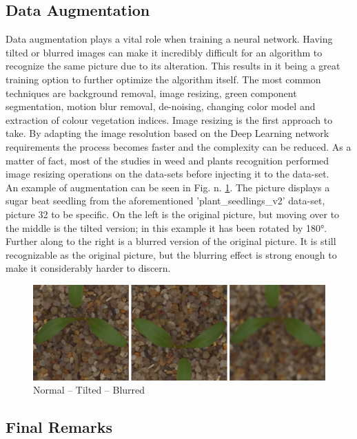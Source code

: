 \documentclass[english]{lni}
\begin{document}
\subsection{Data Augmentation}
Data augmentation plays a vital role when training a neural network. Having tilted or blurred images can make it incredibly difficult for an algorithm to recognize the same picture due to its alteration. This results in it being a great training option to further optimize the algorithm itself. The most common techniques are background removal, image resizing, green component segmentation, motion blur removal, de-noising, changing color model and extraction of colour vegetation indices.
Image resizing is the first approach to take. By adapting the image resolution based on the Deep Learning network requirements the process becomes faster and the complexity can be reduced. As a matter of fact, most of the studies in weed and plants recognition performed image resizing operations on the data-sets before injecting it to the data-set. \cite{DBLP:journals/corr/abs-2103-01415}\\
An example of augmentation can be seen in Fig. n. \ref{fig:datasetfig1}.  The picture displays a sugar beat seedling from the aforementioned 'plant\_seedlings\_v2' data-set, picture 32 to be specific. On the left is the original picture, but moving over to the middle is the tilted version; in this example it has been rotated by 180°. Further along to the right is a blurred version of the original picture. It is still recognizable as the original picture, but the blurring effect is strong enough to make it considerably harder to discern.
\begin{figure}
    \centering
    \includegraphics[width = 12cm]{img/datasetfig1.jpg}
    \caption{Normal – Tilted – Blurred}
    \label{fig:datasetfig1}
\end{figure}
\subsection{Final Remarks}
\end{document}

